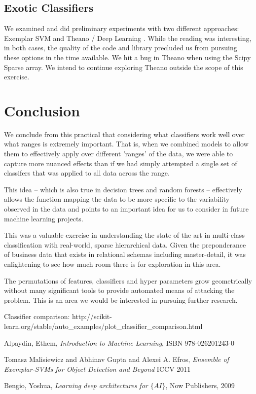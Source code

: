 \documentclass[11pt, oneside]{article}   	%
\begin{document}
\subsection*{Exotic Classifiers}

We examined and did preliminary experiments with two different approaches: Exemplar SVM \cite{exemplar}  and Theano / Deep Learning \cite{deep}. While the reading was interesting, in both cases, the quality of the code and library precluded us from pursuing these options in the time available. We hit a bug in Theano when using the Scipy Sparse array. We intend to continue exploring Theano outside the scope of this exercise.


\section*{Conclusion}

We conclude from this practical that considering what classifiers work well over what ranges is extremely important. That is, when we combined models to allow them to effectively apply over different 'ranges' of the data, we were able to capture more nuanced effects than if we had simply attempted a single set of classifers that was applied to all data across the range. 

This idea -- which is also true in decision trees and random forests -- effectively allows the function mapping the data to be more specific to the variability observed in the data and points to an important idea for us to consider in future machine learning projects.

This was a valuable exercise in understanding the state of the art in multi-class classification with real-world, sparse hierarchical data. Given the preponderance of business data that exists in relational schemas including master-detail, it was enlightening to see how much room there is for exploration in this area.

The permutations of features, classifiers and hyper parameters grow geometrically without many significant tools to provide automated means of attacking the problem. This is an area we would be interested in pursuing further research.

\begin{thebibliography}{1}

  Classifier comparison:
  http://scikit-learn.org/stable/auto\_examples/plot\_classifier\_comparison.html
  
   Alpaydin, Ethem, \emph{Introduction to Machine Learning}, ISBN 978-026201243-0

  Tomasz Malisiewicz and Abhinav Gupta and Alexei A. Efros, \emph{Ensemble of Exemplar-SVMs for Object Detection and Beyond} ICCV 2011

  Bengio, Yoshua, \emph{Learning deep architectures for $\{AI\}$}, Now Publishers, 2009

  \end{thebibliography}
\end{document}
